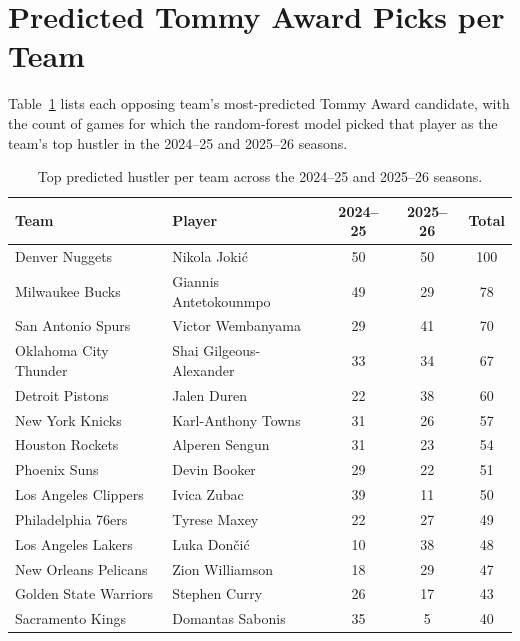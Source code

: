 \documentclass[11pt]{article}
\begin{document}
\section{Predicted Tommy Award Picks per Team}
Table~\ref{tab:team-picks} lists each opposing team's most-predicted
Tommy Award candidate, with the count of games for which the
random-forest model picked that player as the team's top hustler in
the 2024--25 and 2025--26 seasons.

\begin{table}[H]
    \centering
    \caption{Top predicted hustler per team across the 2024--25 and 2025--26 seasons.}
    \label{tab:team-picks}
    \renewcommand{\arraystretch}{1.2}
    \begin{tabular}{l l c c c}
        \toprule
        \textbf{Team} & \textbf{Player} & \textbf{2024--25} & \textbf{2025--26} & \textbf{Total} \\
        \midrule
        Denver Nuggets         & Nikola Jokić            & 50 & 50 & 100 \\
        Milwaukee Bucks        & Giannis Antetokounmpo   & 49 & 29 & 78 \\
        San Antonio Spurs      & Victor Wembanyama       & 29 & 41 & 70 \\
        Oklahoma City Thunder  & Shai Gilgeous-Alexander & 33 & 34 & 67 \\
        Detroit Pistons        & Jalen Duren             & 22 & 38 & 60 \\
        New York Knicks        & Karl-Anthony Towns      & 31 & 26 & 57 \\
        Houston Rockets        & Alperen Sengun          & 31 & 23 & 54 \\
        Phoenix Suns           & Devin Booker            & 29 & 22 & 51 \\
        Los Angeles Clippers   & Ivica Zubac             & 39 & 11 & 50 \\
        Philadelphia 76ers     & Tyrese Maxey            & 22 & 27 & 49 \\
        Los Angeles Lakers     & Luka Dončić             & 10 & 38 & 48 \\
        New Orleans Pelicans   & Zion Williamson         & 18 & 29 & 47 \\
        Golden State Warriors  & Stephen Curry           & 26 & 17 & 43 \\
        Sacramento Kings       & Domantas Sabonis        & 35 &  5 & 40 \\

\end{tabular}
\end{table}
\end{document}
